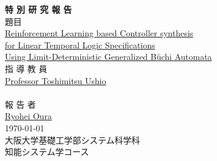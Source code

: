 \documentclass[a4j,12pt,oneside,openany,english,dvipdfmx]{jsbook}
\begin{document}
\thispagestyle{empty}
\begin{center}
\vspace*{5mm}
{\Huge {\bf 特 \hspace{12pt} 別 \hspace{12pt} 研 \hspace{12pt} 究 \hspace{12pt} 報 \hspace{12pt} 告}}\\
\vspace{2cm}
{\Large 題\hspace{8mm}目}\\
\vspace{1cm}
\underline{\Large{ Reinforcement Learning based Controller synthesis}} \\
\vspace{0.5cm}
\underline{\Large{ for Linear Temporal Logic Specifications }} \\
\vspace{0.5cm}
\underline{\Large{Using Limit-Deterministic Generalized B\"{u}chi Automata}} \\
\vspace{12mm}
{\large 指 導 教 員}\\
\vspace{6mm}
\underline{\Large Professor Toshimitsu Ushio}\\
　\\
\vspace{8mm}
{\large 報 告 者}\\
\vspace{6mm}
\underline{\Large Ryohei Oura}\\
\vspace{10mm}
{\Large \today}\\
\vspace{14mm}
{\Large 大阪大学基礎工学部システム科学科\\知能システム学コース}\\
\end{center}
\clearpage
\setcounter{page}{0}

\begin{abstract}
  
\end{abstract}
\end{document}
